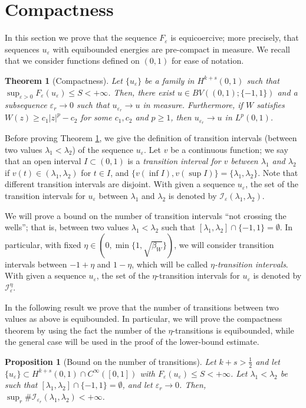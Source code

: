 \documentclass{article}
\newtheorem{proposition}[lemma]{Proposition}
\newtheorem{theorem}[lemma]{Theorem}
\newcommand{\e}{\varepsilon}
\begin{document}
\section{Compactness} 
In this section we prove that the sequence $F_\e$ is equicoercive; more precisely, that sequences $u_\e$ with equibounded energies are pre-compact in measure. We recall that we consider functions defined on $(0,1)$ for ease of notation.

\begin{theorem}[Compactness]\label{compth} 
Let $\{u_\e\}$ be a family in $H^{k+s}(0,1)$ such that $\sup_{\e>0} F_\e(u_\e)\le S<+\infty$. Then, there exist $u\in BV((0,1);\{-1,1\})$ and a subsequence $\e_r\to 0$ such that $u_{\e_r}\to u$ in measure.  Furthermore, if  $W$ satisfies $W(z)\ge c_1|z|^p-c_2$ for some $c_1,c_2$ and $p\ge 1$, then $u_{\e_r}\to u$ in $L^p(0,1)$.
\end{theorem} 


Before proving Theorem \ref{compth}, we give the definition of transition intervals (between two values $\lambda_1<\lambda_2$) of the sequence $u_\e$. Let $v$ be a continuous function; we say that an open interval $I\subset(0,1)$ is a {\em transition interval for $v$ between $\lambda_1$ and $\lambda_2$} if $v(t)\in(\lambda_1,\lambda_2)$ for $t\in I$, and $\{v(\inf I), v(\sup I)\}=\{\lambda_1,\lambda_2\}$. Note that different transition intervals are disjoint.
With given a sequence $u_\e$, the set of the transition intervals for $u_\e$ between $\lambda_1$ and $\lambda_2$ is denoted by $\mathcal I_\e(\lambda_1,\lambda_2)$. 

We will prove a bound on the number of transition intervals ``not crossing the wells''; that is, between two values $\lambda_1<\lambda_2$ such that $[\lambda_1,\lambda_2]\cap \{-1,1\}=\emptyset$. In particular, with fixed
$\eta\in(0,\min\{1,\sqrt{\beta_W}\})$, we will consider transition intervals between $-1+\eta$ and $1-\eta$, which will be called $\eta${\em-transition intervals}.
With given a sequence $u_\e$, the set of the $\eta$-transition intervals for $u_\e$ is denoted by $\mathcal I_\e^\eta$.

In the following result we prove that the number of transitions between two values as above is equibounded. In particular, we will prove the compactness theorem by using the fact the number of the $\eta$-transitions is equibounded, while the general case will be used in the proof of the lower-bound estimate. 

\begin{proposition}[Bound on the number of transitions]\label{numbound}  
Let $k+s>\frac12$ and let $\{u_\e\}\subset H^{k+s}(0,1)\cap C^\infty([0,1])$ with $F_\e(u_\e)\le S<+\infty$. Let $\lambda_1<\lambda_2$ be such that 
$[\lambda_1,\lambda_2]\cap\{-1,1\}=\emptyset$, and let $\e_r\to 0$. Then,
$\sup_r \#\mathcal I_{\e_r}(\lambda_1,\lambda_2)<+\infty$.
\end{proposition}
\end{document}
